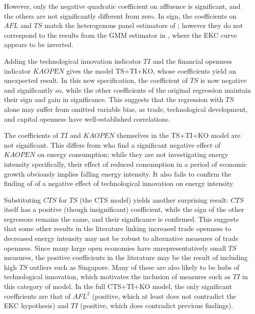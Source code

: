 \documentclass[12pt,a4paper]{article}
\begin{document}
However, only the negative quadratic coefficient on affluence is significant, and the others are not significantly different from zero. 
In sign, the coefficients on $AFL$ and $TS$ match the heterogenous panel estimators of \cite[Table 5]{rafiqUrbanizationOpennessEmissions2016}; however they do not correspond to the results from the GMM estimator in \cite[Appendix Table 5]{rafiqUrbanizationOpennessEmissions2016}, where the EKC curve appears to be inverted.

Adding the technological innovation indicator $TI$ and the financial openness indicator $KAOPEN$ gives the model TS+TI+KO, whose coefficients yield an unexpected result.
In this new specification, the coefficient of $TS$ is now negative and significantly so, while the other coefficients of the original regression maintain their sign and gain in significance.
This suggests that the regression with $TS$ alone may suffer from omitted variable bias, as trade, technological development, and capital openness have well-established correlations.

The coefficients of $TI$ and $KAOPEN$ themselves in the TS+TI+KO model are not significant.
This differs from \cite{koengkanPositiveImpactTrade2018} who find a significant negative effect of $KAOPEN$ on energy consumption; while they are not investigating energy intensity specifically, their effect of reduced consumption in a period of economic growth obviously implies falling energy intensity.
It also fails to confirm the finding of \cite{panHowIndustrializationTrade2019} of a negative effect of technological innovation on energy intensity.

\FloatBarrier

Substituting $CTS$ for $TS$ (the CTS model) yields another surprising result: $CTS$ itself has a positive (though insignificant) coefficient, while the sign of the other regressors remains the same, and their significance is confirmed. 
This suggests that some other results in the literature linking increased trade openness to decreased energy intensity may not be robust to alternative measures of trade openness.
Since many large open economies have unrepresentatively small $TS$ measures, the positive coefficients in the literature may be the result of including high $TS$ outliers such as Singapore.
Many of these are also likely to be hubs of technological innovation, which motivates the inclusion of measures such as $TI$ in this category of model.
In the full CTS+TI+KO model, the only significant coefficients are that of $AFL^2$ (positive, which at least does not contradict the EKC hypothesis) and $TI$ (positive, which does contradict previous findings).
\end{document}
